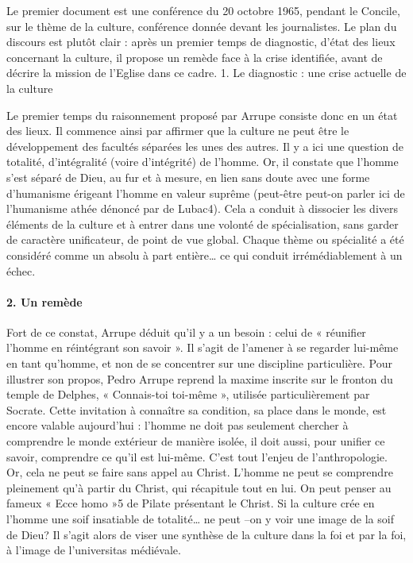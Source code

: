 Le premier document  est une conférence du 20 octobre 1965, pendant le Concile, sur le thème de la culture, conférence donnée devant les journalistes. Le plan du discours est plutôt clair : après un premier temps de diagnostic, d’état des lieux concernant la culture, il propose un remède face à la crise identifiée, avant de décrire la mission de l’Eglise dans ce cadre.
1.	Le diagnostic : une crise actuelle de la culture

Le premier temps du raisonnement proposé par Arrupe consiste donc en un état des lieux. Il commence ainsi par affirmer que la culture ne peut être le développement des facultés séparées les unes des autres. Il y a ici une question de totalité, d’intégralité (voire d’intégrité) de l’homme.
Or, il constate que l’homme s’est séparé de Dieu, au fur et à mesure, en lien sans doute avec une forme d’humanisme érigeant l’homme en valeur suprême (peut-être peut-on parler ici de l’humanisme athée dénoncé par de Lubac4). Cela a conduit à dissocier les divers éléments de la culture et à entrer dans une volonté de spécialisation, sans garder de caractère unificateur, de point de vue global. Chaque thème ou spécialité a été considéré comme un absolu à part entière… ce qui conduit irrémédiablement à un échec.
\paragraph{2.	Un remède}


Fort de ce constat, Arrupe déduit qu’il y a un besoin : celui de « réunifier l’homme en réintégrant son savoir ». Il s’agit de l’amener à se regarder lui-même en tant qu’homme, et non de se concentrer sur une discipline particulière. Pour illustrer son propos, Pedro Arrupe reprend la maxime inscrite sur le fronton du temple de Delphes, « Connais-toi toi-même », utilisée particulièrement par Socrate. Cette invitation à connaître sa condition, sa place dans le monde, est encore valable aujourd’hui : l’homme ne doit pas seulement chercher à comprendre le monde extérieur de manière isolée, il doit aussi, pour unifier ce savoir, comprendre ce qu’il est lui-même. C’est tout l’enjeu de l’anthropologie.
Or, cela ne peut se faire sans appel au Christ. L’homme ne peut se comprendre pleinement qu’à partir du Christ, qui récapitule tout en lui. On peut penser au fameux « Ecce homo »5 de Pilate présentant le Christ. Si la culture crée en l’homme une soif insatiable de totalité… ne peut –on y voir une image de la soif de Dieu? Il s’agit alors de viser une synthèse de la culture dans la foi et par la foi, à l’image de l’universitas médiévale.


